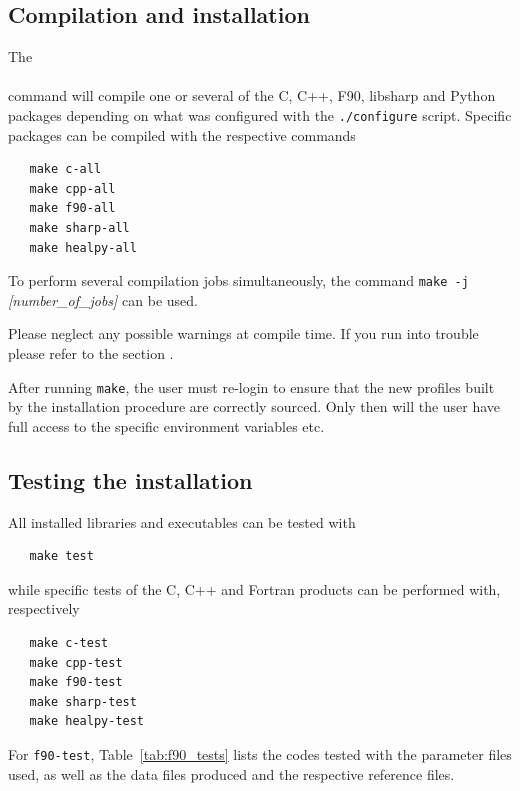 \documentclass[12pt,twoside]{article}
\begin{document}
\subsection{Compilation and installation}

The \\
 \\
command will compile one or several of the C, C++, F90, libsharp and Python packages
depending on what was configured with the \texttt{./configure} script.
Specific packages can be compiled with the respective commands 
\begin{verbatim}
   make c-all
   make cpp-all
   make f90-all
   make sharp-all
   make healpy-all
\end{verbatim}

To perform several compilation jobs simultaneously, the command \texttt{make -j }\textit{[number\_of\_jobs]}
can be used.

Please neglect any possible warnings at compile time. If you run into
trouble please refer to the section .

After running \texttt{make}, the user must re-login to ensure that the new profiles built by the installation
procedure are correctly sourced. Only then will the
user have full access to the specific \healpix
environment variables etc.

\subsection{Testing the installation}

All installed libraries and executables can be tested with 
\begin{verbatim}
   make test
\end{verbatim}

while specific tests of the C, C++ and Fortran products can be performed with,
respectively
\begin{verbatim}
   make c-test
   make cpp-test
   make f90-test
   make sharp-test
   make healpy-test
\end{verbatim}
For \texttt{f90-test}, Table~\ref{tab:f90_tests} lists the codes tested with the
parameter files used, as well as the data files produced and the respective
reference files.
\end{document}
